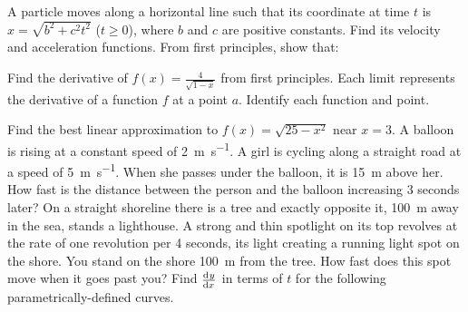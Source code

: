 \begin{questions}
  \questioM A particle moves along a horizontal line such that its coordinate at time $ t $ is $ x = \sqrt{b^2 + c^2 t^2} $ ($ t \geq 0 $),
            where $ b $ and $ c $ are positive constants. Find its velocity and acceleration functions.
  \questioM From first principles, show that:
  \questioE Find the derivative of $ f(x) = \frac{4}{\sqrt{1 - x}} $ from first principles.
  \questioE Each limit represents the derivative of a function $ f $ at a point $ a $. Identify each function and point.
  \questioM Find the best linear approximation to $ f(x) = \sqrt{25 - x^2} $ near $ x = 3 $.
  \questioM A balloon is rising at a constant speed of \SI{2}{\metre\per\second}. A girl is cycling along a straight
            road at a speed of \SI{5}{\metre\per\second}. When she passes under the balloon, it is \SI{15}{\metre} above
            her. How fast is the distance between the person and the balloon increasing 3 seconds later?
  \questioE On a straight shoreline there is a tree and exactly opposite it, \SI{100}{\metre} away in the sea, stands a lighthouse.
            A strong and thin spotlight on its top revolves at the rate of one revolution per 4 seconds, its light
            creating a running light spot on the shore. You stand on the shore \SI{100}{\metre} from the tree. How fast does this
            spot move when it goes past you?
  \questioM Find $ \od{y}{x} $ in terms of $ t $ for the following parametrically-defined curves.
    \begin{parts}

\end{parts}
\end{questions}
